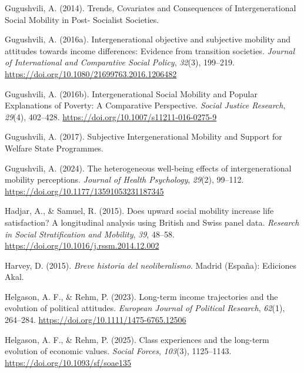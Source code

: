 \documentclass[
  12pt,
]{article}
\newlength{\cslhangindent}
\newenvironment{CSLReferences}[2] %
 {\begin{list}{}{%
  \setlength{\itemindent}{0pt}
  \setlength{\leftmargin}{0pt}
  \setlength{\parsep}{0pt}
  \ifodd #1
   \setlength{\leftmargin}{\cslhangindent}
   \setlength{\itemindent}{-1\cslhangindent}
  \fi
  \setlength{\itemsep}{#2\baselineskip}}}
 {\end{list}}
\begin{document}
\begin{CSLReferences}{1}{0}
Gugushvili, A. (2014). Trends, {Covariates} and {Consequences} of
{Intergenerational Social Mobility} in {Post- Socialist Societies}.

Gugushvili, A. (2016a). Intergenerational objective and subjective
mobility and attitudes towards income differences: Evidence from
transition societies. \emph{Journal of International and Comparative
Social Policy}, \emph{32}(3), 199--219.
\url{https://doi.org/10.1080/21699763.2016.1206482}

Gugushvili, A. (2016b). Intergenerational {Social Mobility} and {Popular
Explanations} of {Poverty}: {A Comparative Perspective}. \emph{Social
Justice Research}, \emph{29}(4), 402--428.
\url{https://doi.org/10.1007/s11211-016-0275-9}

Gugushvili, A. (2017). Subjective {Intergenerational Mobility} and
{Support} for {Welfare State Programmes}.

Gugushvili, A. (2024). The heterogeneous well-being effects of
intergenerational mobility perceptions. \emph{Journal of Health
Psychology}, \emph{29}(2), 99--112.
\url{https://doi.org/10.1177/13591053231187345}

Hadjar, A., \& Samuel, R. (2015). Does upward social mobility increase
life satisfaction? {A} longitudinal analysis using {British} and {Swiss}
panel data. \emph{Research in Social Stratification and Mobility},
\emph{39}, 48--58. \url{https://doi.org/10.1016/j.rssm.2014.12.002}

Harvey, D. (2015). \emph{{Breve historia del neoliberalismo}}. Madrid
(Espa{ñ}a): Ediciones Akal.

Helgason, A. F., \& Rehm, P. (2023). Long-term income trajectories and
the evolution of political attitudes. \emph{European Journal of
Political Research}, \emph{62}(1), 264--284.
\url{https://doi.org/10.1111/1475-6765.12506}

Helgason, A. F., \& Rehm, P. (2025). Class experiences and the long-term
evolution of economic values. \emph{Social Forces}, \emph{103}(3),
1125--1143. \url{https://doi.org/10.1093/sf/soae135}


\end{CSLReferences}
\end{document}
